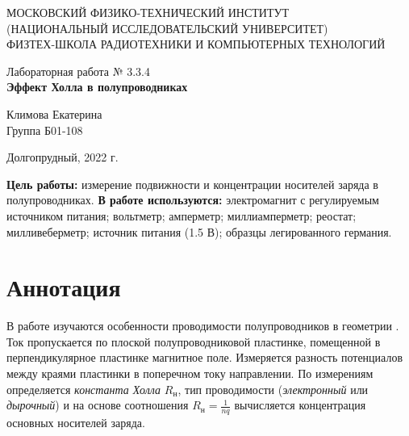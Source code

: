 \documentclass[a4paper,12pt]{article} %
\begin{document}
\begin{center}
	\footnotesize{МОСКОВСКИЙ ФИЗИКО-ТЕХНИЧЕСКИЙ ИНСТИТУТ\\(НАЦИОНАЛЬНЫЙ 			ИССЛЕДОВАТЕЛЬСКИЙ УНИВЕРСИТЕТ)}\\
	\footnotesize{ФИЗТЕХ-ШКОЛА РАДИОТЕХНИКИ И КОМПЬЮТЕРНЫХ ТЕХНОЛОГИЙ\\}
	\hfill \break
	\hfill \break
	\hfill \break
	\hfill \break
	\hfill \break
	\hfill \break
\end{center}

\begin{center}   
    \hfill \break
	\hfill \break
	\hfill \break
	\hfill \break
	\hfill \break
	\hfill \break
	\hfill \break
	\hfill \break
	\hfill \break
	\hfill \break
	\hfill \break
	\large{Лабораторная работа № 3.3.4\\\large{\textbf{Эффект Холла в полупроводниках}}}\\
	\hfill \break
	\hfill \break
	\hfill \break
	\hfill \break
	\hfill \break
	\hfill \break
	\hfill \break
	\hfill \break
	\hfill \break
	\hfill \break
	\hfill \break
	\begin{flushright}
		Климова Екатерина\\
		Группа Б01-108
	\end{flushright}
	\hfill \break
\end{center}
\hfill \break
\hfill \break
\begin{center}
	Долгопрудный, 2022 г.
\end{center}
\thispagestyle{empty}

\newpage
\hfill \break
\textbf{Цель работы:} измерение подвижности и концентрации носителей заряда в полупроводниках.
\hfill \break
\hfill \break
\textbf{В работе используются:} электромагнит с регулируемым источником питания; вольтметр; амперметр; миллиамперметр; реостат; милливеберметр; источник питания (1.5 В); образцы легированного германия.

\section{Аннотация}
\hfill \break
В работе изучаются особенности проводимости полупроводников в геометрии . Ток пропускается по плоской полупроводниковой пластинке, помещенной в перпендикулярное пластинке магнитное поле. Измеряется разность потенциалов между краями пластинки в поперечном току направлении. По измерениям определяется \textit{константа Холла} $R_\text{н}$, тип проводимости (\textit{электронный} или \textit{дырочный}) и на основе соотношения $R_\text{н} = \frac{1}{nq}$ вычисляется концентрация основных носителей заряда.
\end{document}
